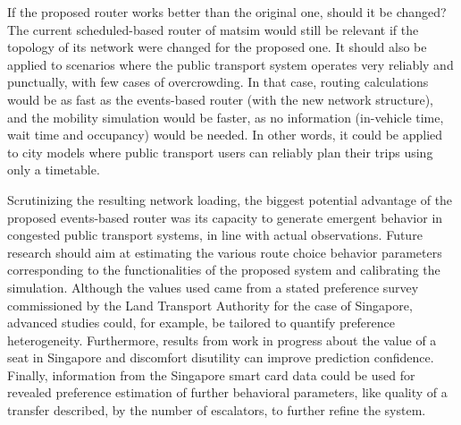 If the proposed router works better than the original one, should it be changed? The current scheduled-based router of \gls{matsim} would still be relevant if the topology of its network were changed for the proposed one. It should also be applied to scenarios where the public transport system operates very reliably and punctually, with few cases of overcrowding. In that case, routing calculations would be as fast as the events-based router (with the new network structure), and the mobility simulation would be faster, as no information (in-vehicle time, wait time and occupancy) would be needed. In other words, it could be applied to city models where public transport users can reliably plan their trips using only a timetable.

Scrutinizing the resulting network loading, the biggest potential advantage of the proposed events-based router was its capacity to generate emergent behavior in congested public transport systems, in line with actual observations. Future research should aim at estimating the various route choice behavior parameters corresponding to the functionalities of the proposed system and calibrating the simulation. Although the values used came from a stated preference survey commissioned by the Land Transport Authority for the case of Singapore, advanced studies could, for example, be tailored to quantify preference heterogeneity. Furthermore, results from work in progress about the value of a seat in Singapore and discomfort disutility can improve prediction confidence. Finally, information from the Singapore smart card data could be used for revealed preference estimation of further behavioral parameters, like quality of a transfer described, \eg by the number of escalators, to further refine the system.



